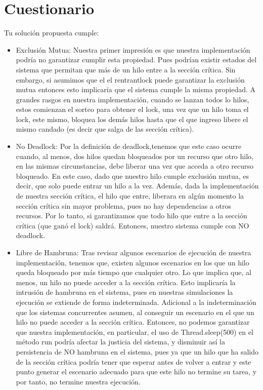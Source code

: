 \documentclass[10pt,letterpaper]{article}
\begin{document}
\section*{Cuestionario}

Tu solución propuesta cumple:

\begin{itemize}
    \item Exclusión Mutua:
    Nuestra primer impresión es que nuestra implementación podría no garantizar cumplir esta propiedad. Pues podrían existir estados del sistema que permitan que más de un hilo entre a la sección crítica. Sin embargo, si asumimos que el el rentrantlock puede garantizar la exclusión mutua entonces esto implicaría que el sistema cumple la misma propiedad. A grandes rasgos en nuestra implementación, cuando se lanzan todos lo hilos, estos comienzan el sorteo para obtener el lock, una vez que un hilo toma el lock, este mismo, bloquea los demás hilos hasta que el que ingreso libere el mismo candado (es decir que salga de las sección crítica).

    \item No Deadlock:
    Por la definición de deadlock,tenemos que este caso ocurre cuando, al menos, dos hilos quedan bloqueados por un recurso que otro hilo, en las mismas circunstancias, debe liberar una vez que acceda a otro recurso bloqueado. En este caso, dado que nuestro hilo cumple exclusión mutua, es decir, que solo puede entrar un hilo a la vez. Además, dada la implementación de nuestra sección crítica, el hilo que entre, liberara en algún momento  la sección crítica sin mayor problema, pues no hay dependencias a otros recursos. Por lo tanto, si garantizamos que todo hilo que entre a la sección crítica (que ganó el lock) saldrá. Entonces, nuestro sistema cumple con NO deadlock.

    \item Libre de Hambruna:
    Tras revisar algunos escenarios de ejecución de nuestra implementación, tenemos que, existen algunos escenarios en los que un hilo queda bloqueado por más tiempo que cualquier otro. Lo que implica que, al menos, un hilo no puede acceder a la sección crítica. Esto implicaría la intrusión de hambruna en el sistema, pues en nuestras simulaciones la ejecución se extiende de forma indeterminada. Adicional a la indeterminación que los sistemas concurrentes asumen, al conseguir un escenario en el que un hilo no puede acceder a la sección crítica. Entonces, no podemos garantizar que nuestra implementación, en particular, el uso de Thread.sleep(500) en el método run podría afectar la justicia del sistema, y disminuir así la persistencia de NO hambruna en el sistema, pues ya que un hilo que ha salido de la sección crítica podría tener que esperar antes de volver a entrar y este punto generar el escenario adecuado para que este hilo no termine su tarea, y por tanto, no termine nuestra ejecución.
\end{itemize}
\end{document}

